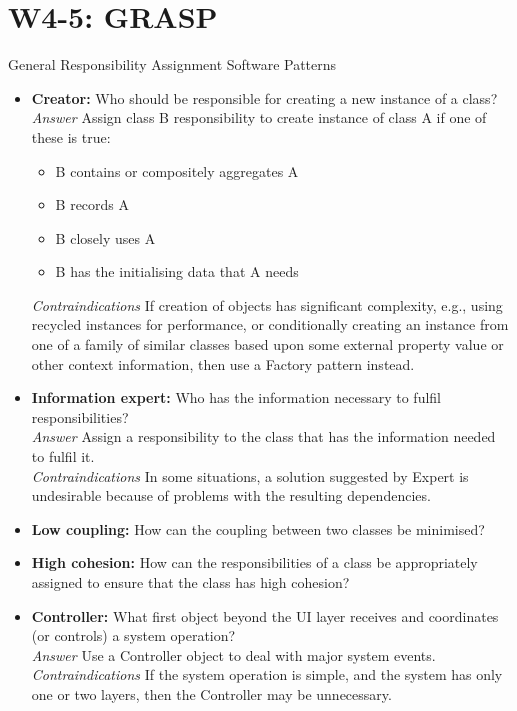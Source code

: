 \section{W4-5: GRASP}
General Responsibility Assignment Software Patterns
\begin{itemize}
    \item \textbf{Creator:} Who should be responsible for creating a new instance of a class?\\
    \textit{Answer} Assign class B responsibility to create instance of class A if one of these is true:
    \begin{itemize}
        \item B contains or compositely aggregates A
        \item B records A
        \item B closely uses A
        \item B has the initialising data that A needs
    \end{itemize}
    \textit{Contraindications} If creation of objects has significant complexity, e.g., using recycled instances for performance, or conditionally creating an instance from one of a family of similar classes based upon some external property value or other context information, then use a Factory pattern instead.
    \item \textbf{Information expert:} Who has the information necessary to fulfil responsibilities?\\
    \textit{Answer} Assign a responsibility to the class that has the information needed to fulfil it.\\
    \textit{Contraindications} In some situations, a solution suggested by Expert is undesirable because of problems with the resulting dependencies.
    \item \textbf{Low coupling:} How can the coupling between two classes be minimised?\\
    \item \textbf{High cohesion:} How can the responsibilities of a class be appropriately assigned to ensure that the class has high cohesion?\\
    \item \textbf{Controller:} What first object beyond the UI layer receives and coordinates (or controls) a system operation?\\
    \textit{Answer} Use a Controller object to deal with major system events.\\
    \textit{Contraindications} If the system operation is simple, and the system has only one or two layers, then the Controller may be unnecessary.

\end{itemize}
